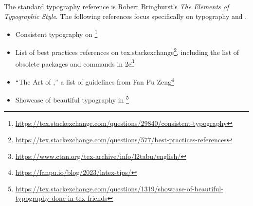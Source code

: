 The standard typography reference is Robert Bringhurst's \emph{The Elements of Typographic Style}. 
The following references focus specifically on typography and \LaTeXx.
\begin{itemize}
    \item Consistent typography on \footnote{\url{https://tex.stackexchange.com/questions/29840/consistent-typography}}
    \item List of best practices references on tex.stackexchange\footnote{\url{https://tex.stackexchange.com/questions/577/best-practices-references}}, including the list of obsolete packages and commands in 2e\footnote{\url{https://www.ctan.org/tex-archive/info/l2tabu/english/}}
    \item ``The Art of \LaTeXx,'' a list of guidelines from Fan Pu Zeng\footnote{\url{https://fanpu.io/blog/2023/latex-tips/}}
    \item Showcase of beautiful typography in \LaTeXx\footnote{\url{https://tex.stackexchange.com/questions/1319/showcase-of-beautiful-typography-done-in-tex-friends}}
\end{itemize}

